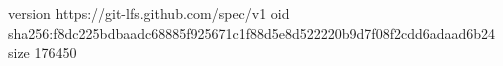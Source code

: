 version https://git-lfs.github.com/spec/v1
oid sha256:f8dc225bdbaadc68885f925671c1f88d5e8d522220b9d7f08f2cdd6adaad6b24
size 176450
